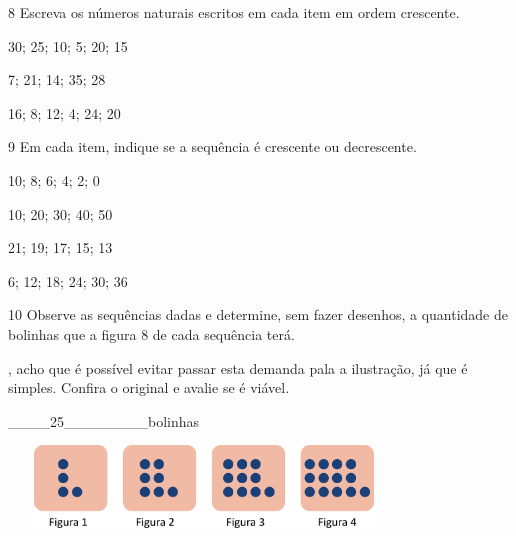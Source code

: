 \begin{escolha}
\num{8} Escreva os números naturais escritos em cada item em ordem crescente.

\begin{escolha}

\item
  30; 25; 10; 5; 20; 15

\item
  7; 21; 14; 35; 28

\item
  16; 8; 12; 4; 24; 20

\end{escolha}

\num{9} Em cada item, indique se a sequência é crescente ou decrescente.

\begin{escolha}

\item
  10; 8; 6; 4; 2; 0

\item
  10; 20; 30; 40; 50

\item
  21; 19; 17; 15; 13

\item
  6; 12; 18; 24; 30; 36

\end{escolha}

\num{10} Observe as sequências dadas e determine, sem fazer desenhos, a
quantidade de bolinhas que a figura 8 de cada sequência terá.

\Paulo, acho que é possível evitar passar esta demanda pala a ilustração, já que é simples. Confira o original e avalie se é viável.

\begin{escolha}

\item
  \_\_\_\_25\_\_\_\_\_\_\_\_bolinhas
\end{escolha}

\includegraphics[width=4.09202in,height=0.85841in]{media/image32.png}


\end{escolha}
